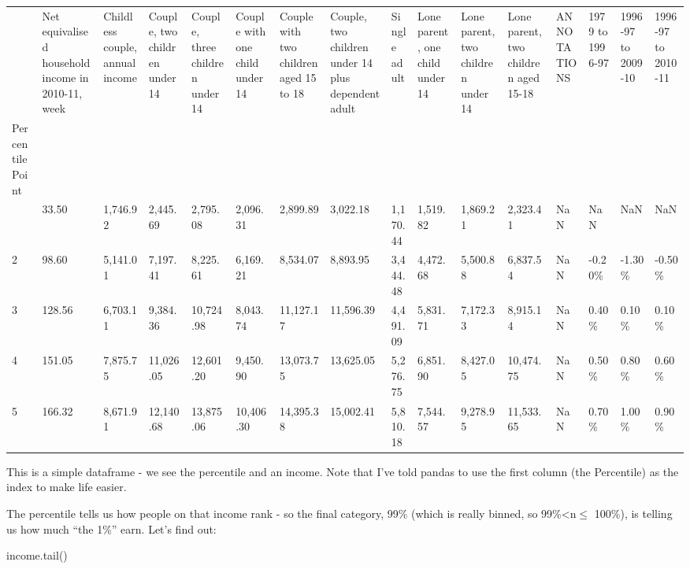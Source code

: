 \documentclass[
  letterpaper,
  DIV=11,
  numbers=noendperiod]{scrreprt}
\newenvironment{Shaded}{\begin{snugshade}}{\end{snugshade}}
\newcommand{\NormalTok}[1]{\textcolor[rgb]{0.00,0.23,0.31}{#1}}
\begin{document}
\begin{longtable}[]{@{}llllllllllllllll@{}}
\toprule\noalign{}
& Net equivalised household income in 2010-11, week & Childless couple,
annual income & Couple, two children under 14 & Couple, three children
under 14 & Couple with one child under 14 & Couple with two children
aged 15 to 18 & Couple, two children under 14 plus dependent adult &
Single adult & Lone parent, one child under 14 & Lone parent, two
children under 14 & Lone parent, two children aged 15-18 & ANNOTATIONS &
1979 to 1996-97 & 1996-97 to 2009-10 & 1996-97 to 2010-11 \\
Percentile Point & & & & & & & & & & & & & & & \\
\midrule\noalign{}
\endhead
\bottomrule\noalign{}
\endlastfoot
1 & 33.50 & 1,746.92 & 2,445.69 & 2,795.08 & 2,096.31 & 2,899.89 &
3,022.18 & 1,170.44 & 1,519.82 & 1,869.21 & 2,323.41 & NaN & NaN & NaN &
NaN \\
2 & 98.60 & 5,141.01 & 7,197.41 & 8,225.61 & 6,169.21 & 8,534.07 &
8,893.95 & 3,444.48 & 4,472.68 & 5,500.88 & 6,837.54 & NaN & -0.20\% &
-1.30\% & -0.50\% \\
3 & 128.56 & 6,703.11 & 9,384.36 & 10,724.98 & 8,043.74 & 11,127.17 &
11,596.39 & 4,491.09 & 5,831.71 & 7,172.33 & 8,915.14 & NaN & 0.40\% &
0.10\% & 0.10\% \\
4 & 151.05 & 7,875.75 & 11,026.05 & 12,601.20 & 9,450.90 & 13,073.75 &
13,625.05 & 5,276.75 & 6,851.90 & 8,427.05 & 10,474.75 & NaN & 0.50\% &
0.80\% & 0.60\% \\
5 & 166.32 & 8,671.91 & 12,140.68 & 13,875.06 & 10,406.30 & 14,395.38 &
15,002.41 & 5,810.18 & 7,544.57 & 9,278.95 & 11,533.65 & NaN & 0.70\% &
1.00\% & 0.90\% \\
\end{longtable}

This is a simple dataframe - we see the percentile and an income. Note
that I've told pandas to use the first column (the Percentile) as the
index to make life easier.

The percentile tells us how people on that income rank - so the final
category, 99\% (which is really binned, so 99\%\textless n\(\leq\)
100\%), is telling us how much ``the 1\%'' earn. Let's find out:

\begin{Shaded}
\begin{Highlighting}[]
\NormalTok{income.tail()}
\end{Highlighting}
\end{Shaded}
\end{document}
